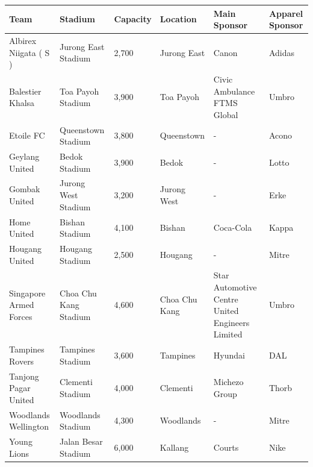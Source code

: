 \documentclass{article}
\begin{document}
\begin{tabular}{llllll}
\toprule
Team & Stadium & Capacity & Location & Main Sponsor & Apparel Sponsor \\
\midrule
Albirex Niigata ( S ) & Jurong East Stadium & 2,700 & Jurong East & Canon & Adidas \\
Balestier Khalsa & Toa Payoh Stadium & 3,900 & Toa Payoh & Civic Ambulance FTMS Global & Umbro \\
Etoile FC & Queenstown Stadium & 3,800 & Queenstown & - & Acono \\
Geylang United & Bedok Stadium & 3,900 & Bedok & - & Lotto \\
Gombak United & Jurong West Stadium & 3,200 & Jurong West & - & Erke \\
Home United & Bishan Stadium & 4,100 & Bishan & Coca-Cola & Kappa \\
Hougang United & Hougang Stadium & 2,500 & Hougang & - & Mitre \\
Singapore Armed Forces & Choa Chu Kang Stadium & 4,600 & Choa Chu Kang & Star Automotive Centre United Engineers Limited & Umbro \\
Tampines Rovers & Tampines Stadium & 3,600 & Tampines & Hyundai & DAL \\
Tanjong Pagar United & Clementi Stadium & 4,000 & Clementi & Michezo Group & Thorb \\
Woodlands Wellington & Woodlands Stadium & 4,300 & Woodlands & - & Mitre \\
Young Lions & Jalan Besar Stadium & 6,000 & Kallang & Courts & Nike \\
\bottomrule
\end{tabular}
\end{document}
